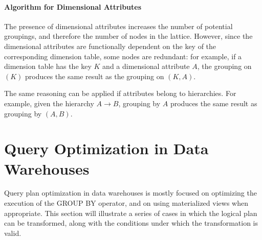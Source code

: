 \paragraph{Algorithm for Dimensional Attributes} The presence of dimensional attributes increases the number of potential groupings, and therefore the number of nodes in the lattice. However, since the dimensional attributes are functionally dependent on the key of the corresponding dimension table, some nodes are redundant: for example, if a dimension table has the key $K$ and a dimensional attribute $A$, the grouping on $(K)$ produces the same result as the grouping on $(K,A)$.

The same reasoning can be applied if attributes belong to hierarchies. For example, given the hierarchy $A \rightarrow B$, grouping by $A$ produces the same result as grouping by $(A,B)$.

\section{Query Optimization in Data Warehouses}

Query plan optimization in data warehouses is mostly focused on optimizing the execution of the GROUP BY operator, and on using materialized views when appropriate. This section will illustrate a series of cases in which the logical plan can be transformed, along with the conditions under which the transformation is valid.

